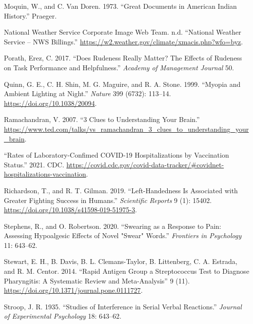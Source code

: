 \documentclass[
]{report}
\newlength{\cslhangindent}
\newlength{\cslentryspacingunit} %
\newenvironment{CSLReferences}[2] %
 {%
  \setlength{\parindent}{0pt}
  \ifodd #1
  \let\oldpar\par
  \def\par{\hangindent=\cslhangindent\oldpar}
  \fi
  \setlength{\parskip}{#2\cslentryspacingunit}
 }%
 {}
\begin{document}
\begin{CSLReferences}{1}{0}
\leavevmode{}%
Moquin, W., and C. Van Doren. 1973. {``Great Documents in American Indian History.''} Praeger.

\leavevmode{}%
National Weather Service Corporate Image Web Team. n.d. {``National Weather Service -- {NWS} Billings.''} \url{https://w2.weather.gov/climate/xmacis.php?wfo=byz}.

\leavevmode{}%
Porath, Erez, C. 2017. {``Does Rudeness Really Matter? The Effects of Rudeness on Task Performance and Helpfulness.''} \emph{Academy of Management Journal} 50.

\leavevmode{}%
Quinn, G. E., C. H. Shin, M. G. Maguire, and R. A. Stone. 1999. {``Myopia and Ambient Lighting at Night.''} \emph{Nature} 399 (6732): 113--14. \url{https://doi.org/10.1038/20094}.

\leavevmode{}%
Ramachandran, V. 2007. {``3 Clues to Understanding Your Brain.''} \url{https://www.ted.com/talks/vs_ramachandran_3_clues_to_understanding_your_brain}.

\leavevmode{}%
{``Rates of Laboratory-Confimed COVID-19 Hospitalizations by Vaccination Status.''} 2021. CDC. \url{https://covid.cdc.gov/covid-data-tracker/\#covidnet-hospitalizations-vaccination}.

\leavevmode{}%
Richardson, T., and R. T. Gilman. 2019. {``Left-Handedness Is Associated with Greater Fighting Success in Humans.''} \emph{Scientific Reports} 9 (1): 15402. \url{https://doi.org/10.1038/s41598-019-51975-3}.

\leavevmode{}%
Stephens, R., and O. Robertson. 2020. {``Swearing as a Response to Pain: Assessing Hypoalgesic Effects of Novel "Swear" Words.''} \emph{Frontiers in Psychology} 11: 643--62.

\leavevmode{}%
Stewart, E. H., B. Davis, B. L. Clemans-Taylor, B. Littenberg, C. A. Estrada, and R. M. Centor. 2014. {``Rapid Antigen Group a Streptococcus Test to Diagnose Pharyngitis: A Systematic Review and Meta-Analysis''} 9 (11). \url{https://doi.org/10.1371/journal.pone.0111727}.

\leavevmode{}%
Stroop, J. R. 1935. {``Studies of Interference in Serial Verbal Reactions.''} \emph{Journal of Experimental Psychology} 18: 643--62.


\end{CSLReferences}
\end{document}

